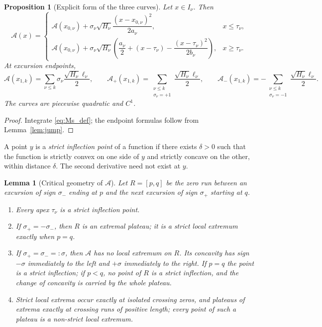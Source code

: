 \documentclass[11pt]{amsart}
\numberwithin{equation}{section}
\theoremstyle{plain}
\newtheorem{proposition}[theorem]{Proposition}
\newtheorem{lemma}[theorem]{Lemma}
\theoremstyle{definition}
\theoremstyle{remark}
\newcommand{\Ap}{\mathcal{A}_{+}}
\newcommand{\Am}{\mathcal{A}_{-}}
\newcommand{\Anet}{\mathcal{A}}
\begin{document}
\begin{proposition}[Explicit form of the three curves]
\label{prop:explicit}
Let $x\in I_\nu$. Then
\begin{equation}
\label{eq:explicit_A}
\Anet(x)=
\begin{cases}
\Anet(x_{0,\nu})+\sigma_\nu\sqrt{H_\nu}
\dfrac{(x-x_{0,\nu})^2}{2a_\nu},&x\le\tau_\nu,\\[2ex]
\Anet(x_{0,\nu})+\sigma_\nu\sqrt{H_\nu}
\left(\dfrac{a_\nu}{2}+(x-\tau_\nu)-
\dfrac{(x-\tau_\nu)^2}{2b_\nu}\right),&x\ge\tau_\nu.
\end{cases}
\end{equation}
At excursion endpoints,
\begin{equation}
\label{eq:explicit_net}
\Anet(x_{1,k})=\sum_{\nu\le k}\sigma_\nu\frac{\sqrt{H_\nu}\ell_\nu}{2},\qquad
\Ap(x_{1,k})=\sum_{\substack{\nu\le k\\\sigma_\nu=+1}}
\frac{\sqrt{H_\nu}\ell_\nu}{2},\qquad
\Am(x_{1,k})=-\sum_{\substack{\nu\le k\\\sigma_\nu=-1}}
\frac{\sqrt{H_\nu}\ell_\nu}{2}.
\end{equation}
The curves are piecewise quadratic and $C^1$.
\end{proposition}

\begin{proof}
Integrate \eqref{eq:Ms_def}; the endpoint formulas follow from
Lemma~\ref{lem:jump}.
\end{proof}

A point $y$ is a \emph{strict inflection point} of a function if there
exists $\delta>0$ such that the function is strictly convex on one side of
$y$ and strictly concave on the other, within distance $\delta$. The second
derivative need not exist at $y$.

\begin{lemma}[Critical geometry of $\Anet$]
\label{lem:critical}
Let $R=[p,q]$ be the zero run between an excursion of sign $\sigma_-$ ending
at $p$ and the next excursion of sign $\sigma_+$ starting at $q$.
\begin{enumerate}[label=\textup{(\roman*)}]
\item Every apex $\tau_\nu$ is a strict inflection point.
\item If $\sigma_+=-\sigma_-$, then $R$ is an extremal plateau; it is a
strict local extremum exactly when $p=q$.
\item If $\sigma_+=\sigma_-=:\sigma$, then $\Anet$ has no local extremum on
$R$. Its concavity has sign $-\sigma$ immediately to the left and $+\sigma$
immediately to the right. If $p=q$ the point is a strict inflection; if
$p<q$, no point of $R$ is a strict inflection, and the change of concavity
is carried by the whole plateau.
\item Strict local extrema occur exactly at isolated crossing zeros, and
plateaus of extrema exactly at crossing runs of positive length; every point
of such a plateau is a non-strict local extremum.
\end{enumerate}
\end{lemma}
\end{document}
